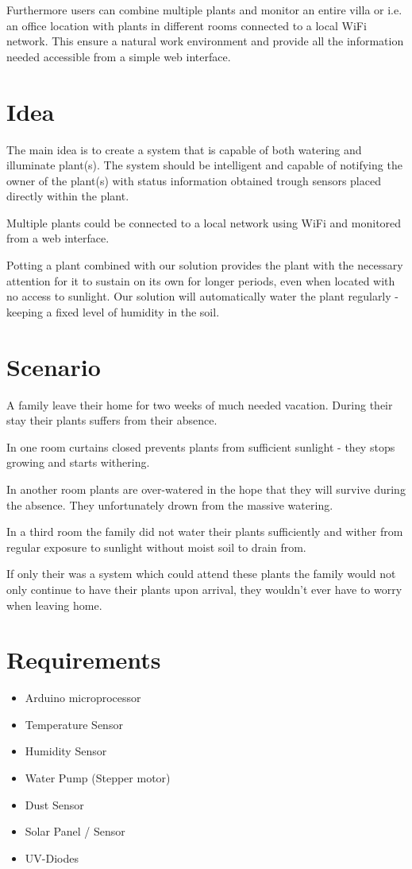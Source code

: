\documentclass{ubicomp2012}
\begin{document}
Furthermore users can combine multiple plants and monitor an entire villa or i.e. an office location with plants in different rooms connected to a local WiFi network. This ensure a natural work environment and provide all the information needed accessible from a simple web interface.

\section{Idea}
The main idea is to create a system that is capable of both watering and illuminate plant(s). The system should be intelligent and capable of notifying the owner of the plant(s) with status information obtained trough sensors placed directly within the plant.

Multiple plants could be connected to a local network using WiFi and monitored from a web interface.

Potting a plant combined with our solution provides the plant with the necessary attention for it to sustain on its own for longer periods, even when located with no access to sunlight. Our solution will automatically water the plant regularly - keeping a fixed level of humidity in the soil.

\section{Scenario}
A family leave their home for two weeks of much needed vacation. During their stay their plants suffers from their absence.

In one room curtains closed prevents plants from sufficient sunlight - they stops growing and starts withering.

In another room plants are over-watered in the hope that they will survive during the absence. They unfortunately drown from the massive watering.

In a third room the family did not water their plants sufficiently and wither from regular exposure to sunlight without moist soil to drain from.

If only their was a system which could attend these plants the family would not only continue to have their plants upon arrival, they wouldn't ever have to worry when leaving home.

\section{Requirements}
\begin{itemize}
\item Arduino microprocessor
\item Temperature Sensor
\item Humidity Sensor
\item Water Pump (Stepper motor)
\item Dust Sensor
\item Solar Panel / Sensor
\item UV-Diodes 
\end{itemize}
\end{document}
